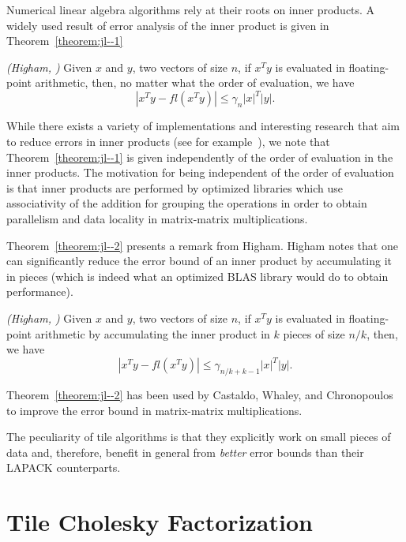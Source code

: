 Numerical linear algebra algorithms rely at their roots on inner products.
A widely used result of error analysis of the inner product is given in Theorem~\ref{theorem:jl--1} 
\begin{theorem}\emph{(Higham, \cite[Eq.(3.5)]{Higham:2002:ASN})}
\label{theorem:jl--1}
Given $x$ and $y$, two vectors of size $n$, 
if $x^Ty$ is evaluated in floating-point arithmetic, then, 
no matter what the order of evaluation, we have
\begin{equation*}
| x^T y - fl( x^T y ) | \leq \gamma_n |x |^T |y |.
\end{equation*}
\end{theorem}
While there exists a variety of implementations and interesting research that
aim to reduce errors in inner products (see for
example~\cite[chapter~3~and~4]{Higham:2002:ASN}), we note that
Theorem~\ref{theorem:jl--1}
 is given independently of the order of evaluation in the inner
products.  The motivation for being independent of the order of evaluation is
that inner products are performed by optimized libraries which use
associativity of the addition for grouping the operations in order to obtain
parallelism and data locality in matrix-matrix multiplications.

Theorem~\ref{theorem:jl--2} presents a remark from Higham.
Higham notes that one can significantly reduce the error bound of an inner
product by accumulating it in pieces (which is indeed what an optimized BLAS library would do
to obtain performance).
\begin{theorem}\emph{(Higham, \cite[\S3.1]{Higham:2002:ASN})}
\label{theorem:jl--2}
Given $x$ and $y$, two vectors of size $n$, 
if $x^Ty$ is evaluated in floating-point arithmetic
 by accumulating the inner product in $k$ pieces of size $n/k$,
then, we have
\begin{equation*}
| x^T y - fl( x^T y ) | \leq \gamma_{n/k+k-1} |x |^T |y |.
\end{equation*}
\end{theorem}
Theorem~\ref{theorem:jl--2} has been used by
Castaldo, Whaley, and Chronopoulos~\cite{Castaldo:2008:RFP} to improve the 
error bound in matrix-matrix multiplications.

The peculiarity of tile algorithms is that they explicitly work on small pieces of data
and, therefore, benefit in general from {\em better} error bounds than their LAPACK counterparts.

\section{Tile Cholesky Factorization}

